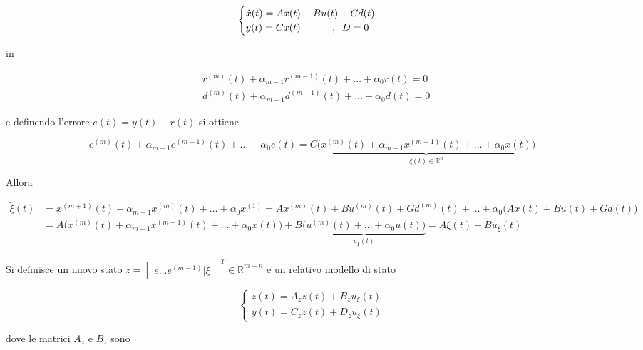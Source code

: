 	\begin{equation}
		\begin{cases}
			\dot{x}(t)=Ax(t)+Bu(t)+Gd(t) \\
			y(t)=Cx(t) \trippleSpacing \trippleSpacing, \singleSpacing D=0
		\end{cases}
		\label{eq:sistema}
	\end{equation}
	  
	\noindent in 
	
	\begin{align*}
		& r^{(m)}(t)+\alpha_{m-1}r^{(m-1)}(t)+\dots+\alpha_0r(t)=0 \\
		& d^{(m)}(t)+\alpha_{m-1}d^{(m-1)}(t)+\dots+\alpha_0d(t)=0 
	\end{align*}
	
	\noindent e definendo l'errore $e(t)=y(t)-r(t)$ si ottiene
	
	\begin{equation}
		e^{(m)}(t)+\alpha_{m-1}e^{(m-1)}(t)+\dots+\alpha_0e(t)=C\underbrace{\Big(x^{(m)}(t)+\alpha_{m-1}x^{(m-1)}(t)+\dots+\alpha_0x(t)\Big)}_\text{$\xi(t) \in \mathbb{R}^n $}
	\end{equation}
	
	\noindent Allora 
	
	\begin{align*}
		\dot{\xi}(t) &= x^{(m+1)}(t)+\alpha_{m-1}x^{(m)}(t)+\dots+\alpha_0x^{(1)}=   Ax^{(m)}(t)+Bu^{(m)}(t)+Gd^{(m)}(t)+\dots+\alpha_0\Big(Ax(t)+Bu(t)+Gd(t)\Big) \\
		&=A\Big(x^{(m)}(t)+\alpha_{m-1}x^{(m-1)}(t)+\dots+\alpha_0x(t)\Big)+B\underbrace{\Big(u^{(m)}(t)+\dots+\alpha_0u(t)\Big)}_\text{$u_{\xi}(t)$}=A\xi(t)+Bu_{\xi}(t)
	\end{align*}
	
	\noindent Si definisce un nuovo stato $z=\begin{bmatrix}e \dots e^{(m-1)} | \xi\end{bmatrix}^T \in \mathbb{R}^{m+n}$ e un relativo modello di stato
	
	\begin{equation}
		\begin{cases}
			\dot{z}(t)=A_zz(t)+B_zu_{\xi}(t) \\
			y(t)=C_zz(t)+D_zu_{\xi}(t)
		\end{cases}
	\end{equation}
	
	\noindent dove le matrici $A_z$ e $B_z$ sono
	
	
	
	
	
	
	
	
	
	
	
	
	
	